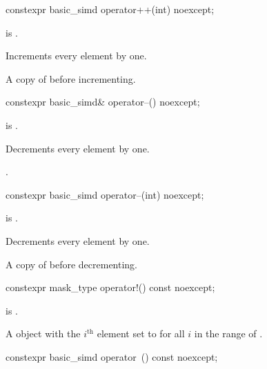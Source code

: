\begin{itemdecl}
constexpr basic_simd operator++(int) noexcept;
\end{itemdecl}

\begin{itemdescr}
\pnum
\constraints
{} is .

\pnum
\effects
Increments every element by one.

\pnum
\returns
A copy of  before incrementing.
\end{itemdescr}

\begin{itemdecl}
constexpr basic_simd& operator--() noexcept;
\end{itemdecl}

\begin{itemdescr}
\pnum
\constraints
{} is .

\pnum
\effects
Decrements every element by one.

\pnum
\returns
{}.
\end{itemdescr}

\begin{itemdecl}
constexpr basic_simd operator--(int) noexcept;
\end{itemdecl}

\begin{itemdescr}
\pnum
\constraints
{} is .

\pnum
\effects
Decrements every element by one.

\pnum
\returns
A copy of  before decrementing.
\end{itemdescr}

\begin{itemdecl}
constexpr mask_type operator!() const noexcept;
\end{itemdecl}

\begin{itemdescr}
\pnum
\constraints
{} is .

\pnum
\returns
A  object with the $i^\text{th}$ element set to
 for all $i$ in the range of .
\end{itemdescr}

\begin{itemdecl}
constexpr basic_simd operator~() const noexcept;
\end{itemdecl}


